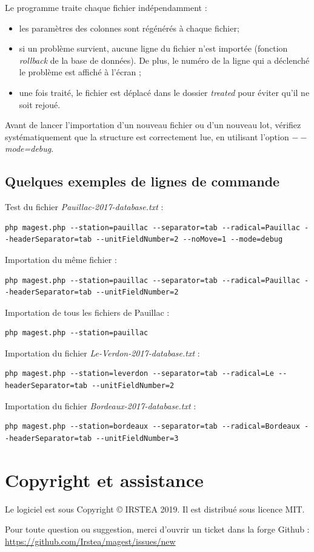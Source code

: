 \documentclass[12pt,a4paper]{article}
\begin{document}
Le programme traite chaque fichier indépendamment :
\begin{itemize}
\item les paramètres des colonnes sont régénérés à chaque fichier;
\item si un problème survient, aucune ligne du fichier n'est importée (fonction \textit{rollback} de la base de données). De plus, le numéro de la ligne qui a déclenché le problème est affiché à l'écran ;
\item une fois traité, le fichier est déplacé dans le dossier \textit{treated} pour éviter qu'il ne soit rejoué.
\end{itemize}

Avant de lancer l'importation d'un nouveau fichier ou d'un nouveau lot, vérifiez systématiquement que la structure est correctement lue, en utilisant l'option \textit{$--$mode=debug}.

\subsection{Quelques exemples de lignes de commande}
Test du fichier \textit{Pauillac-2017-database.txt} :
\begin{lstlisting}
php magest.php --station=pauillac --separator=tab --radical=Pauillac --headerSeparator=tab --unitFieldNumber=2 --noMove=1 --mode=debug
\end{lstlisting}
Importation du même fichier :
\begin{lstlisting}
php magest.php --station=pauillac --separator=tab --radical=Pauillac --headerSeparator=tab --unitFieldNumber=2
\end{lstlisting}
Importation de tous les fichiers de Pauillac :
\begin{lstlisting}
php magest.php --station=pauillac
\end{lstlisting}
Importation du fichier \textit{Le-Verdon-2017-database.txt} :
\begin{lstlisting}
php magest.php --station=leverdon --separator=tab --radical=Le --headerSeparator=tab --unitFieldNumber=2
\end{lstlisting}
Importation du fichier \textit{Bordeaux-2017-database.txt} :
\begin{lstlisting}
php magest.php --station=bordeaux --separator=tab --radical=Bordeaux --headerSeparator=tab --unitFieldNumber=3
\end{lstlisting}

\section{Copyright et assistance}
Le logiciel est sous Copyright © IRSTEA 2019. Il est distribué sous licence MIT.

Pour toute question ou suggestion, merci d'ouvrir un ticket dans la forge Github : \href{https://github.com/Irstea/magest/issues/new}{https://github.com/Irstea/magest/issues/new}
\end{document}

